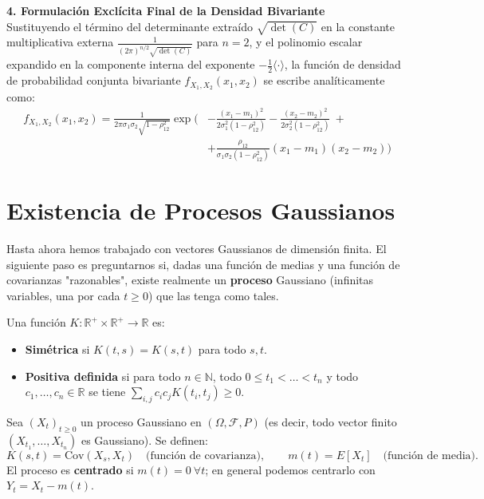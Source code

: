 \begin{ejemplo}[Deducción Explícita para la Dimensión $n = 2$]
\noindent \textbf{4. Formulación Exclícita Final de la Densidad Bivariante} \\
Sustituyendo el término del determinante extraído $\sqrt{\det(C)}$ en la constante multiplicativa externa $\frac{1}{(2\pi)^{n/2}\sqrt{\det(C)}}$ para $n=2$, y el polinomio escalar expandido en la componente interna del exponente $-\frac{1}{2}\langle \cdot \rangle$, la función de densidad de probabilidad conjunta bivariante $f_{X_1, X_2}(x_1, x_2)$ se escribe analíticamente como:
\begin{align*}
f_{X_1, X_2}(x_1, x_2) = \frac{1}{2\pi \sigma_1 \sigma_2 \sqrt{1 - \rho_{12}^2}} \exp \Biggl( &-\frac{(x_1 - m_1)^2}{2\sigma_1^2 (1 - \rho_{12}^2)} - \frac{(x_2 - m_2)^2}{2\sigma_2^2 (1 - \rho_{12}^2)} \ + \\
&+ \frac{\rho_{12}}{\sigma_1 \sigma_2 (1 - \rho_{12}^2)} (x_1 - m_1)(x_2 - m_2) \Biggr)
\end{align*}

\end{ejemplo}

\section{Existencia de Procesos Gaussianos}

\noindent
Hasta ahora hemos trabajado con vectores Gaussianos de dimensión finita. El siguiente paso es preguntarnos si, dadas una función de medias y una función de covarianzas "razonables", existe realmente un \textbf{proceso} Gaussiano (infinitas variables, una por cada $t\ge0$) que las tenga como tales.

\begin{definicion}
Una función $K:\mathbb{R}^+\times\mathbb{R}^+\to\mathbb{R}$ es:
\begin{itemize}
    \item \textbf{Simétrica} si $K(t,s)=K(s,t)$ para todo $s,t$.
    \item \textbf{Positiva definida} si para todo $n\in\mathbb{N}$, todo $0\le t_1<\dots<t_n$ y todo $c_1,\dots,c_n\in\mathbb{R}$ se tiene $\sum_{i,j} c_ic_j K(t_i,t_j)\ge 0$.
\end{itemize}
\end{definicion}

\begin{definicion}
Sea $(X_t)_{t\ge0}$ un proceso Gaussiano en $(\Omega,\mathcal{F},P)$ (es decir, todo vector finito $(X_{t_1},\dots,X_{t_n})$ es Gaussiano). Se definen:
\[
K(s,t) = \text{Cov}(X_s,X_t) \quad \text{(función de covarianza)}, \qquad m(t)=E[X_t] \quad \text{(función de media)}.
\]
El proceso es \textbf{centrado} si $m(t)=0\ \forall t$; en general podemos centrarlo con $Y_t = X_t - m(t)$.
\end{definicion}

